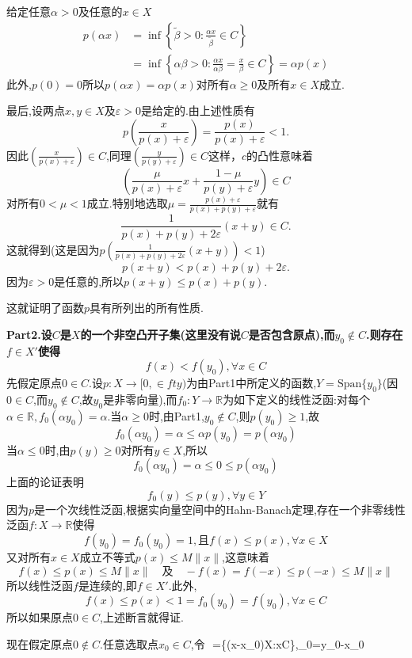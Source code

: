 给定任意$\alpha>0$及任意的$x\in X$
$$
\begin{aligned}
    p(\alpha x) &= \inf\left\{\widetilde{\beta}>0:\frac{\alpha x}{\widetilde{\beta}}\in C\right\}\\
                &= \inf\left\{\alpha\beta>0:\frac{\alpha x}{\alpha\beta}=\frac{x}{\beta}\in C\right\}=\alpha p(x)
\end{aligned}
$$
此外,$p(0)=0$所以$p(\alpha x)=\alpha p(x)$对所有$\alpha\geqslant0$及所有$x\in X$成立.\par
最后,设两点$x,y\in X$及$\varepsilon>0$是给定的.由上述性质有
$$
p\left(\frac{x}{p(x)+\varepsilon}\right)=\frac{p(x)}{p(x)+\varepsilon}<1.
$$
因此$\left(\frac{x}{p(x)+\varepsilon}\right)\in C$,同理$\left(\frac{y}{p(y)+\varepsilon}\right)\in C$这样，$c$的凸性意味着
$$
\left(\frac{\mu}{p(x)+\varepsilon}x+{\frac{1-\mu}{p(y)+\varepsilon}}y\right)\in C
$$
对所有$0<\mu<1$成立.特别地选取$\mu=\frac{p(x)+\varepsilon}{p(x)+p(y)+\varepsilon}$就有
$$
\frac{1}{p(x)+p(y)+2\varepsilon}(x+y)\in C.
$$
这就得到(这是因为$p\left(\frac{1}{p(x)+p(y)+2\varepsilon}(x+y)\right)<1$)
$$
p(x+y)<p(x)+p(y)+2\varepsilon.
$$
因为$\varepsilon>0$是任意的,所以$p(x+y)\leqslant p(x)+p(y)$.\par
这就证明了函数$p$具有所列出的所有性质.\par
\textbf{Part2.设$C$是$X$的一个非空凸开子集(这里没有说$C$是否包含原点),而$y_{0}\not\in C$.则存在$f\in X'$使得}
$$
f(x)<f(y_0),\forall x\in C
$$
先假定原点$0\in C$.设$p:X\to[0,\in fty)$为由Part1中所定义的函数,$Y=\mathrm{Span}\{y_{0}\}$(因$0\in $$C$,而$y_{0}\not\in C$,故$y_{0}$是非零向量),而$f_{0}:Y\to\mathbb{R}$为如下定义的线性泛函:对每个$\alpha\in \mathbb{R},f_{0}(\alpha y_{0})=\alpha$.当$\alpha\geqslant0$时,由Part1,$y_{0}\not\in C$,则$p(y_{0})\geqslant1$,故
$$
f_0(\alpha y_0)=\alpha\leqslant \alpha p(y_0)=p(\alpha y_0)
$$
当$\alpha\leqslant 0$时,由$p(y)\geqslant0$对所有$y\in X$,所以
$$
f_0(\alpha y_0)=\alpha\leqslant 0\leqslant p(\alpha y_0)
$$
上面的论证表明
$$
f_0(y)\leqslant p(y),\forall y\in Y
$$
因为$p$是一个次线性泛函,根据实向量空间中的Hahn-Banach定理,存在一个非零线性泛函$f:X\to\mathbb{R}$使得
$$
f(y_0)=f_0(y_0)=1,\text{且}f(x)\leqslant p(x),\forall x\in X
$$
又对所有$x\in X$成立不等式$p(x)\leqslant M\|x\|$,这意味着
$$
f(x)\leqslant p(x)\leqslant M\|x\|\quad\text{及}\quad -f(x)=f(-x)\leqslant p(-x)\leqslant M\|x\|
$$
所以线性泛函$f$是连续的,即$f\in X'$.此外,
$$
f(x)\leqslant p(x)<1=f_0(y_0)=f(y_0),\forall x\in C
$$
所以如果原点$0\in C$,上述断言就得证.\par
现在假定原点$0\notin C$.任意选取点$x_{0}\in C$,令
$$
=\{(x-x_0)\in X:x\in C\},_0=y_0-x_0
